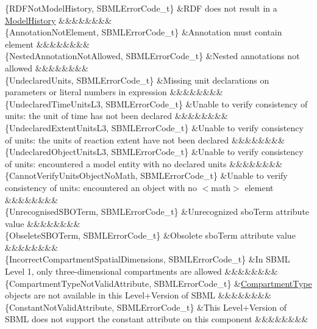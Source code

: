 \begin{DoxyParagraph}{}
\begin{longtabu}
\{R\+D\+F\+Not\+Model\+History, S\+B\+M\+L\+Error\+Code\+\_\+t\} &R\+DF does not result in a \hyperlink{class_model_history}{Model\+History} &&&&&&&&\\
\{Annotation\+Not\+Element, S\+B\+M\+L\+Error\+Code\+\_\+t\} &Annotation must contain element &&&&&&&&\\
\{Nested\+Annotation\+Not\+Allowed, S\+B\+M\+L\+Error\+Code\+\_\+t\} &Nested annotations not allowed &&&&&&&&\\
\{Undeclared\+Units, S\+B\+M\+L\+Error\+Code\+\_\+t\} &Missing unit declarations on parameters or literal numbers in expression &&&&&&&&\\
\{Undeclared\+Time\+Units\+L3, S\+B\+M\+L\+Error\+Code\+\_\+t\} &Unable to verify consistency of units\+: the unit of time has not been declared &&&&&&&&\\
\{Undeclared\+Extent\+Units\+L3, S\+B\+M\+L\+Error\+Code\+\_\+t\} &Unable to verify consistency of units\+: the units of reaction extent have not been declared &&&&&&&&\\
\{Undeclared\+Object\+Units\+L3, S\+B\+M\+L\+Error\+Code\+\_\+t\} &Unable to verify consistency of units\+: encountered a model entity with no declared units &&&&&&&&\\
\{Cannot\+Verify\+Units\+Object\+No\+Math, S\+B\+M\+L\+Error\+Code\+\_\+t\} &Unable to verify consistency of units\+: encountered an object with no {\ttfamily $<$math$>$} element &&&&&&&&\\
\{Unrecognised\+S\+B\+O\+Term, S\+B\+M\+L\+Error\+Code\+\_\+t\} &Unrecognized \textquotesingle{}sbo\+Term\textquotesingle{} attribute value &&&&&&&&\\
\{Obselete\+S\+B\+O\+Term, S\+B\+M\+L\+Error\+Code\+\_\+t\} &Obsolete \textquotesingle{}sbo\+Term\textquotesingle{} attribute value &&&&&&&&\\
\{Incorrect\+Compartment\+Spatial\+Dimensions, S\+B\+M\+L\+Error\+Code\+\_\+t\} &In S\+B\+ML Level 1, only three-\/dimensional compartments are allowed &&&&&&&&\\
\{Compartment\+Type\+Not\+Valid\+Attribute, S\+B\+M\+L\+Error\+Code\+\_\+t\} &\hyperlink{class_compartment_type}{Compartment\+Type} objects are not available in this Level+\+Version of S\+B\+ML &&&&&&&&\\
\{Constant\+Not\+Valid\+Attribute, S\+B\+M\+L\+Error\+Code\+\_\+t\} &This Level+\+Version of S\+B\+ML does not support the \textquotesingle{}constant\textquotesingle{} attribute on this component &&&&&&&&\\

\end{longtabu}
\end{DoxyParagraph}
